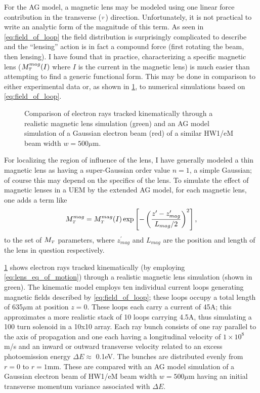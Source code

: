 For the AG model, a magnetic lens may be modeled using one linear force contribution in the transverse ($ {\scriptscriptstyle T} $) direction.
Unfortunately, it is not practical to write an analytic form of the magnitude of this term.
As seen in \ref{eq:field_of_loop} the field distribution is surprisingly complicated to describe and the ``lensing'' action is in fact a compound force (first rotating the beam, then lensing).
I have found that in practice, characterizing a specific magnetic lens ($M_{{\scriptscriptstyle T}}^{mag}(I)$ where $I$ is the current in the magnetic lens) is much easier than attempting to find a generic functional form.
This may be done in comparison to either experimental data or, as shown in \ref{fig:mag_lens_loops}, to numerical simulations based on \ref{eq:field_of_loop}.

\begin{figure}
  \centering
  
  \caption[Comparison of the AG model and a kinematic model of a magnetic lens]{
    Comparison of electron rays tracked kinematically through a realistic magnetic lens simulation (green) and an AG model simulation of a Gaussian electron beam (red) of a similar HW1/eM beam width $ w = 500 \mu\text{m} $.
  }
  \label{fig:mag_lens_loops}
\end{figure}

For localizing the region of influence of the lens, I have generally modeled a thin magnetic lens as having a super-Gaussian order value $n=1$, a simple Gaussian; of course this may depend on the specifics of the lens.
To simulate the effect of magnetic lenses in a UEM by the extended AG model, for each magnetic lens, one adds a term like
\begin{equation}
  M_{{\scriptscriptstyle T}}^{mag} = M_{{\scriptscriptstyle T}}^{mag}(I) \exp \left [ - \left (  \frac{ z^{\prime} - z_{mag}^{\prime} }{ L_{mag} / 2 } \right )^{ 2 } \right ] \text{,}
\end{equation}
to the set of $M_{{\scriptscriptstyle T}}$ parameters, where $z_{mag}^{\prime}$ and $L_{mag}$ are the position and length of the lens in question respectively.

\ref{fig:mag_lens_loops} shows electron rays tracked kinematically (by employing \ref{eq:lens_eq_of_motion}) through a realistic magnetic lens simulation (shown in green).
The kinematic model employs ten individual current loops generating magnetic fields described by \ref{eq:field_of_loop}; these loops occupy a total length of 635$\mu$m at position $z=0$.
These loops each carry a current of 45A; this approximates a more realistic stack of 10 loops carrying 4.5A, thus simulating a  100 turn solenoid in a 10x10 array.
Each ray bunch consists of one ray parallel to the axis of propagation and one each having a longitudinal velocity of $1 \times 10^{8}$ m/s and an inward or outward transverse velocity related to an excess photoemission energy $\Delta E \approx $ 0.1eV.
The bunches are distributed evenly from $r=0$ to $r = 1$mm.
These are compared with an AG model simulation of a Gaussian electron beam of HW1/eM beam width $ w = 500 \mu\text{m} $ having an initial transverse momentum variance associated with $\Delta E$.

